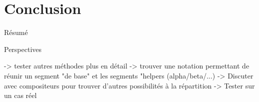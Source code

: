 \chapter*{Conclusion}
Résumé

Perspectives

-> tester autres méthodes plus en détail
-> trouver une notation permettant de réunir un segment "de base" et les segments "helpers (alpha/beta/...)
-> Discuter avec compositeurs pour trouver d'autres possibilités à la répartition
-> Tester sur un cas réel